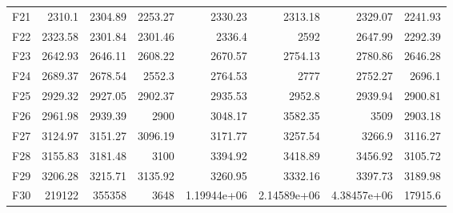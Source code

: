 \documentclass[journal]{IEEEtran}
\begin{document}
\begin{table}[H]
{\begin{tabular}{lrrrrrrr}
F21 & 2310.1 & 2304.89 & 2253.27 & 2330.23 & 2313.18 & 2329.07 & 2241.93\\
F22 & 2323.58 & 2301.84 & 2301.46 & 2336.4 & 2592 & 2647.99 & 2292.39\\
F23 & 2642.93 & 2646.11 & 2608.22 & 2670.57 & 2754.13 & 2780.86 & 2646.28\\
F24 & 2689.37 & 2678.54 & 2552.3 & 2764.53 & 2777 & 2752.27 & 2696.1\\
F25 & 2929.32 & 2927.05 & 2902.37 & 2935.53 & 2952.8 & 2939.94 & 2900.81\\
F26 & 2961.98 & 2939.39 & 2900 & 3048.17 & 3582.35 & 3509 & 2903.18\\
F27 & 3124.97 & 3151.27 & 3096.19 & 3171.77 & 3257.54 & 3266.9 & 3116.27\\
F28 & 3155.83 & 3181.48 & 3100 & 3394.92 & 3418.89 & 3456.92 & 3105.72\\
F29 & 3206.28 & 3215.71 & 3135.92 & 3260.95 & 3332.16 & 3397.73 & 3189.98\\
F30 & 219122 & 355358 & 3648 & 1.19944e+06 & 2.14589e+06 & 4.38457e+06 & 17915.6\\
\bottomrule
\end{tabular}}
\end{table}
\end{document}
